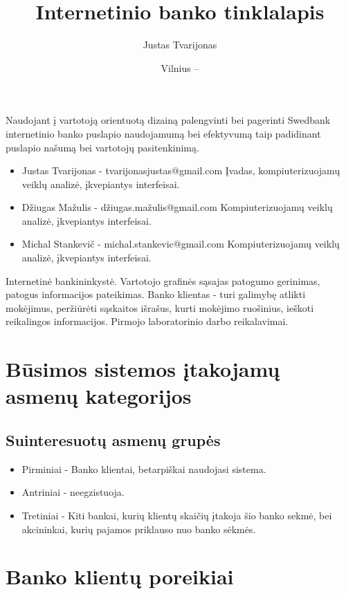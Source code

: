 \documentclass{VUMIFPSkursinis}
\title{Internetinio banko tinklalapis}
\author{Justas Tvarijonas}
\date{Vilnius – \the\year}
\begin{document}
\maketitle
{}
Naudojant į vartotoją orientuotą dizainą palengvinti bei pagerinti Swedbank internetinio banko puslapio naudojamumą bei efektyvumą taip padidinant puslapio našumą bei vartotojų pasitenkinimą.
\begin{itemize}
	\item Justas Tvarijonas - tvarijonasjustas@gmail.com \newline
	Įvadas, kompiuterizuojamų veiklų analizė, įkvepiantys interfeisai.
	\item Džiugas Mažulis - džiugas.mažulis@gmail.com \newline 
	Kompiuterizuojamų veiklų analizė, įkvepiantys interfeisai.
	\item Michal Stankevič - michal.stankevic@gmail.com \newline
	 Kompiuterizuojamų veiklų analizė, įkvepiantys interfeisai.
\end{itemize}
\tableofcontents
{}
Internetinė bankininkystė.
Vartotojo grafinės sąsajas patogumo gerinimas, patogus informacijos pateikimas.
Banko klientas - turi galimybę atlikti mokėjimus, peržiūrėti sąskaitos išrašus, kurti mokėjimo ruošinius, ieškoti reikalingos informacijos.
Pirmojo laboratorinio darbo reikalavimai.
\section{Būsimos sistemos įtakojamų asmenų kategorijos}
\subsection{Suinteresuotų asmenų grupės}
\begin{itemize}
	\item Pirminiai - Banko klientai, betarpiškai naudojasi sistema.
	\item Antriniai - neegzistuoja.
	\item Tretiniai - Kiti bankai, kurių klientų skaičių įtakoja šio banko sekmė, bei akcininkai, kurių pajamos priklauso nuo banko sėkmės.
\end{itemize}
\section{Banko klientų poreikiai}
\end{document}
